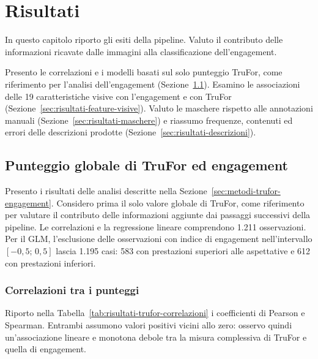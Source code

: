 
\chapter{Risultati}
\label{chap:risultati}

In questo capitolo riporto gli esiti della pipeline. Valuto il contributo delle informazioni ricavate dalle immagini alla classificazione dell'engagement.

Presento le correlazioni e i modelli basati sul solo punteggio TruFor, come riferimento per l'analisi dell'engagement (Sezione~\ref{sec:risultati-trufor-engagement}). Esamino le associazioni delle 19 caratteristiche visive con l'engagement e con TruFor (Sezione~\ref{sec:risultati-feature-visive}). Valuto le maschere rispetto alle annotazioni manuali (Sezione~\ref{sec:risultati-maschere}) e riassumo frequenze, contenuti ed errori delle descrizioni prodotte (Sezione~\ref{sec:risultati-descrizioni}).

\section{Punteggio globale di TruFor ed engagement}
\label{sec:risultati-trufor-engagement}

Presento i risultati delle analisi descritte nella Sezione~\ref{sec:metodi-trufor-engagement}. Considero prima il solo valore globale di TruFor, come riferimento per valutare il contributo delle informazioni aggiunte dai passaggi successivi della pipeline. Le correlazioni e la regressione lineare comprendono 1.211 osservazioni. Per il GLM, l'esclusione delle osservazioni con indice di engagement nell'intervallo $[-0{,}5;\,0{,}5]$ lascia 1.195 casi: 583 con prestazioni superiori alle aspettative e 612 con prestazioni inferiori.

\subsection{Correlazioni tra i punteggi}
\label{subsec:risultati-trufor-correlazioni}

Riporto nella Tabella~\ref{tab:risultati-trufor-correlazioni} i coefficienti di Pearson e Spearman. Entrambi assumono valori positivi vicini allo zero: osservo quindi un'associazione lineare e monotona debole tra la misura complessiva di TruFor e quella di engagement.

